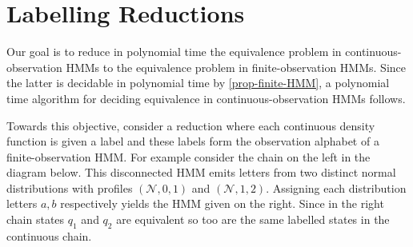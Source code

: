 \documentclass[a4paper,UKenglish,cleveref, autoref,mathscr]{lipics-v2019}
\newcommand{\1}{\mathbbm{1}}
\begin{document}
\section{Labelling Reductions}\label{finitelabred}
Our goal is to reduce in polynomial time the equivalence problem in continuous-observation HMMs to the equivalence problem in finite-observation HMMs.
Since the latter is decidable in polynomial time by \cref{prop-finite-HMM}, a polynomial time algorithm for deciding equivalence in continuous-observation HMMs follows.

Towards this objective, consider a reduction where each continuous density function is given a label and these labels form the observation alphabet of a finite-observation HMM. For example consider the chain on the left in the diagram below. This disconnected HMM emits letters from two distinct normal distributions with profiles $(\mathcal{N}, 0, 1)$ and $(\mathcal{N}, 1, 2)$. Assigning each distribution letters $a,b$ respectively yields the HMM given on the right.
Since in the right chain states $q_1$ and $q_2$ are equivalent so too are the same labelled states in the continuous chain.
\end{document}
